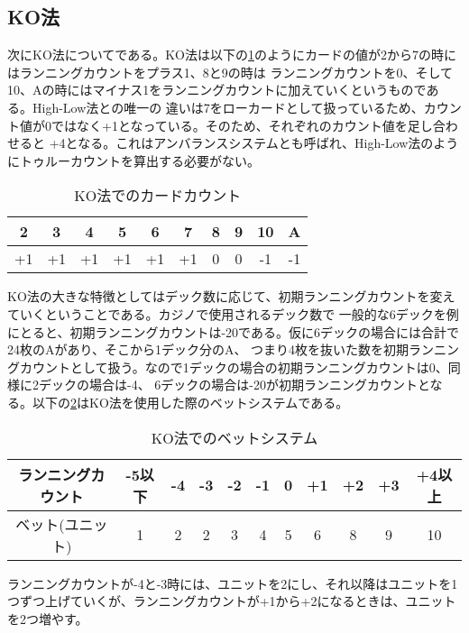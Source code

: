 \subsection{KO法}
次にKO法についてである。KO法は以下の\ref{koc}のようにカードの値が2から7の時にはランニングカウントをプラス1、8と9の時は
ランニングカウントを0、そして10、Aの時にはマイナス1をランニングカウントに加えていくというものである。High-Low法との唯一の
違いは7をローカードとして扱っているため、カウント値が0ではなく+1となっている。そのため、それぞれのカウント値を足し合わせると
+4となる。これはアンバランスシステムとも呼ばれ、High-Low法のようにトゥルーカウントを算出する必要がない。
  \begin{table}[H]
    \centering
    \label{koc}
    \caption{KO法でのカードカウント}
    \begin{tabular}{|c|c|c|c|c|c|c|c|c|c|} \hline
      2&3&4&5&6&7&8&9&10&A \\ \hline
      +1&+1&+1&+1&+1&+1&0&0&-1&-1 \\ \hline
    \end{tabular}
  \end{table}

KO法の大きな特徴としてはデック数に応じて、初期ランニングカウントを変えていくということである。カジノで使用されるデック数で
一般的な6デックを例にとると、初期ランニングカウントは-20である。仮に6デックの場合には合計で24枚のAがあり、そこから1デック分のA、
つまり4枚を抜いた数を初期ランニングカウントとして扱う。なので1デックの場合の初期ランニングカウントは0、同様に2デックの場合は-4、
6デックの場合は-20が初期ランニングカウントとなる。以下の\ref{kob}はKO法を使用した際のベットシステムである。

  \begin{table}[H]
    \centering
    \label{kob}
    \caption{KO法でのベットシステム}
    \begin{tabular}{|c|c|c|c|c|c|c|c|c|c|c|} \hline
      ランニングカウント&-5以下&-4&-3&-2&-1&0&+1&+2&+3&+4以上 \\ \hline
      ベット(ユニット)&1&2&2&3&4&5&6&8&9&10 \\ \hline
    \end{tabular}
  \end{table}
ランニングカウントが-4と-3時には、ユニットを2にし、それ以降はユニットを1つずつ上げていくが、ランニングカウントが+1から+2になるときは、ユニットを2つ増やす。
